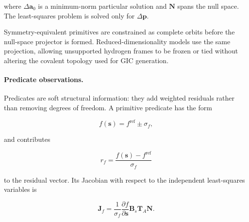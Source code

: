 \documentclass[aip,jcp,reprint,longbibliography,floatfix]{revtex4-2}
\begin{document}
where $\Delta\mathbf{a}_0$ is a minimum-norm particular solution and
$\mathbf{N}$ spans the null space. The least-squares problem is solved only
for $\Delta\mathbf{p}$.

Symmetry-equivalent primitives are constrained as complete orbits before the
null-space projector is formed. Reduced-dimensionality models use the same projection,
allowing unsupported hydrogen frames to be frozen or tied without altering the covalent topology
used for GIC generation.

\paragraph{Predicate observations.}

Predicates are soft structural information: they add weighted residuals rather
than removing degrees of freedom.\cite{Bartell1975Predicate} A primitive
predicate has the form

\begin{equation}
f(\mathbf{s})
=
f^{\mathrm{ref}}
\pm
\sigma_f ,
\end{equation}

and contributes

\begin{equation}
r_f
=
\frac{f(\mathbf{s})-f^{\mathrm{ref}}}{\sigma_f}
\end{equation}

to the residual vector. Its Jacobian with respect to the independent
least-squares variables is

\begin{equation}
\mathbf{J}_f
=
\frac{1}{\sigma_f}
\frac{\partial f}{\partial\mathbf{s}}
\mathbf{B}_s
\mathbf{T}_{A}
\mathbf{N}.
\end{equation}
\end{document}

